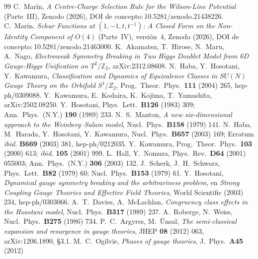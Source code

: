 \documentclass[11pt,a4paper]{article}
\newcommand{\ZZ}{\mathbb{Z}}
\begin{document}
\begin{thebibliography}{99}\small      %
\setlength{\itemsep}{0pt plus 1pt}     %
\setlength{\parsep}{0pt}
 C.~Mar\'in, \emph{A Centre-Charge Selection Rule for the Wilson-Line Potential}
(Parte~III), Zenodo (2026), DOI de concepto:\,10.5281/zenodo.21438226.
 C.~Mar\'in, \emph{Schur Functions at $(1,-1,t,t^{-1})$: A Closed Form on the
Non-Identity Component of $O(4)$} (Parte~IV), versión~4, Zenodo (2026), DOI de
concepto:\,10.5281/zenodo.21463000.
 K.~Akamatsu, T.~Hirose, N.~Maru, A.~Nago, \emph{Electroweak Symmetry Breaking in Two
Higgs Doublet Model from 6D Gauge-Higgs Unification on $T^2/\ZZ_2$}, arXiv:2312.08608.
 N.~Haba, Y.~Hosotani, Y.~Kawamura, \emph{Classification and Dynamics of Equivalence
Classes in $SU(N)$ Gauge Theory on the Orbifold $S^1/Z_2$}, Prog.\ Theor.\ Phys.\ \textbf{111}
(2004) 265, hep-ph/0309088.
 Y.~Kawamura, E.~Kodaira, K.~Kojima, T.~Yamashita, arXiv:2502.08250.
 Y.~Hosotani, Phys.\ Lett.\ \textbf{B126} (1983) 309; Ann.\ Phys.\ (N.Y.)
\textbf{190} (1989) 233.
 N.~S.~Manton, \emph{A new six-dimensional approach to the Weinberg--Salam model},
Nucl.\ Phys.\ \textbf{B158} (1979) 141.
 N.~Haba, M.~Harada, Y.~Hosotani, Y.~Kawamura, Nucl.\ Phys.\ \textbf{B657} (2003) 169;
Erratum \emph{ibid.} \textbf{B669} (2003) 381, hep-ph/0212035.
 Y.~Kawamura, Prog.\ Theor.\ Phys.\ \textbf{103} (2000) 613; \emph{ibid.}
\textbf{105} (2001) 999.
 L.~Hall, Y.~Nomura, Phys.\ Rev.\ \textbf{D64} (2001) 055003; Ann.\ Phys.\ (N.Y.)
\textbf{306} (2003) 132.
 J.~Scherk, J.~H.~Schwarz, Phys.\ Lett.\ \textbf{B82} (1979) 60; Nucl.\ Phys.\
\textbf{B153} (1979) 61.
 Y.~Hosotani, \emph{Dynamical gauge symmetry breaking and the arbitrariness
problem}, en \emph{Strong Coupling Gauge Theories and Effective Field Theories}, World Scientific
(2003) 234, hep-ph/0303066.
 A.~T.~Davies, A.~McLachlan, \emph{Congruency class effects in the Hosotani model},
Nucl.\ Phys.\ \textbf{B317} (1989) 237.
 A.~Roberge, N.~Weiss, Nucl.\ Phys.\ \textbf{B275} (1986) 734.
\bibitem{ArgyresUnsal} P.~C.~Argyres, M.~\"Unsal, \emph{The semi-classical expansion and resurgence
in gauge theories}, JHEP \textbf{08} (2012) 063, arXiv:1206.1890, \S3.1.
\bibitem{Ogilvie} M.~C.~Ogilvie, \emph{Phases of gauge theories}, J.\ Phys.\ \textbf{A45} (2012)

\end{thebibliography}
\end{document}
